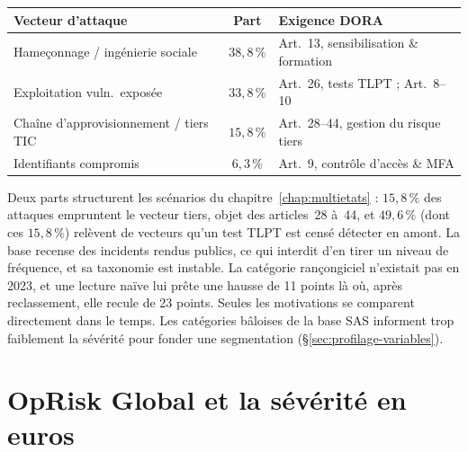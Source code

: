 \begin{center}
\renewcommand{\arraystretch}{1.3}
\begin{tabular}{>{\raggedright}p{5cm} c >{\raggedright\arraybackslash}p{6cm}}
\toprule
\rowcolor{lightblue}
\textbf{Vecteur d'attaque} & \textbf{Part} & \textbf{Exigence DORA} \\
\midrule
Hameçonnage / ingénierie sociale & $38{,}8\,\%$ & Art.~13, sensibilisation \& formation \\
Exploitation vuln.\ exposée & $33{,}8\,\%$ & Art.~26, tests TLPT ; Art.~8--10 \\
Chaîne d'approvisionnement / tiers TIC & $15{,}8\,\%$ & Art.~28--44, gestion du risque tiers \\
Identifiants compromis & $6{,}3\,\%$ & Art.~9, contrôle d'accès \& MFA \\
\bottomrule
\end{tabular}
\end{center}

Deux parts structurent les scénarios du chapitre~\ref{chap:multietats} : $15{,}8\,\%$ des attaques
empruntent le vecteur tiers, objet des articles~28 à~44, et $49{,}6\,\%$ (dont ces $15{,}8\,\%$) relèvent de vecteurs qu'un
test TLPT est censé détecter en amont. La base recense des incidents rendus publics, ce qui interdit
d'en tirer un niveau de fréquence, et sa taxonomie est instable. La catégorie rançongiciel n'existait
pas en 2023, et une lecture naïve lui prête une hausse de 11 points là où, après reclassement, elle recule de 23 points. Seules les motivations se comparent directement dans le temps. Les catégories bâloises de la base SAS informent trop faiblement la sévérité pour fonder une segmentation (\S\ref{sec:profilage-variables}).


\section{OpRisk Global et la sévérité en euros}
\label{sec:oprisk}


